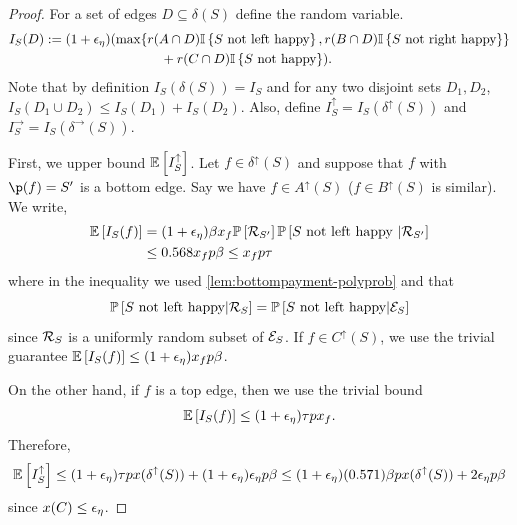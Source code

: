 \begin{proof}
For a set of edges $D \subseteq \delta(S)$ define the random variable.
\begin{align}I_{S}(D):=(1+{\epsilon}_\eta) (\max\{&r(A\cap D){\mathbb{I}}\left\{S\text{ not left happy}\right\} , r(B\cap D){\mathbb{I}}\left\{S\text{ not right happy}\right\}\}\nonumber \\
&\quad + r(C\cap D){\mathbb{I}}\left\{S\text{ not happy}\right\}).\label{def:ISD}
\end{align}
Note that by definition $I_S(\delta(S))=I_S$ and for any two disjoint sets $D_1,D_2$, $I_S(D_1\cup D_2)\leq  I_S(D_1)+I_S(D_2)$.
Also, define $I_S^\uparrow = I_S(\delta^\uparrow(S))$ and $I_S^\rightarrow = I_S(\delta^\rightarrow(S))$.

First, we upper bound ${\mathbb{E}}\left[I^\uparrow_S\right]$.
Let $f\in\delta^\uparrow(S)$ and suppose that $f$ with $\p(f)=S'$ is a bottom edge. Say we have $f\in A^\uparrow(S)$ ($f \in B^\uparrow(S)$ is similar). 
We write,
\begin{align*}{\mathbb{E}}\left[I_S(f)\right]&= (1+{\epsilon}_\eta) \beta x_f {\mathbb{P}}\left[{\mathcal{R}}_{S'}\right]{\mathbb{P}}\left[S \text{ not left happy } | {\mathcal{R}}_{S'}\right]\\
& \le 0.568 x_f p\beta \le x_f p \tau 	
\end{align*}
where in the inequality we used \cref{lem:bottompayment-polyprob} and that 
$${\mathbb{P}}\left[S\text{ not left happy} | {\mathcal{R}}_S\right] = {\mathbb{P}}\left[S\text{ not left happy} | {\cal E}_S\right]$$ 
since ${\mathcal{R}}_S$ is a uniformly random subset of ${\cal E}_S$. If $f \in C^\uparrow(S)$, we use the trivial guarantee ${\mathbb{E}}\left[I_S(f)\right]\le (1+{\epsilon}_\eta) x_f p \beta$. 

On the other hand, if  $f$ is a top edge, then we use the trivial bound
\begin{equation}\label{eq:trivialbottomupS}{\mathbb{E}}\left[I_S(f)\right] \le (1+{\epsilon}_\eta) \tau p x_f.	
\end{equation}
Therefore, 
\begin{equation}
\label{eq:ISup}
{\mathbb{E}}\left[I_S^\uparrow\right] \le (1+{\epsilon}_\eta) \tau p x(\delta^\uparrow(S))  + (1+{\epsilon}_\eta){\epsilon}_\eta p \beta \le (1+{\epsilon}_\eta) (0.571)\beta p x(\delta^\uparrow(S)) + 2{\epsilon}_\eta p \beta 
\end{equation}
since $x(C) \le {\epsilon}_\eta$.


\end{proof}

